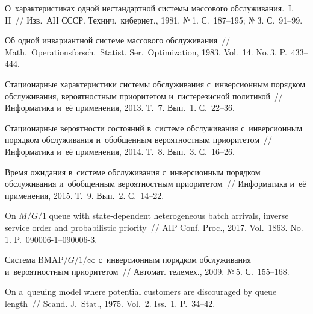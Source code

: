 \begin{multicols}{2}
\vspace*{-18pt}

{\small\frenchspacing
 {%
 \begin{thebibliography}{99}
 
 \vspace*{-3pt}
 
О~характеристиках одной нестандартной системы
массового обслуживания.~I, II~//
Изв.\ АН СССР. Технич.\ кибернет., 1981.
№\,1. С.~187--195; №\,3. С.~91--99.

 Об одной
инвариантной системе массового обслуживания~//
Math.\ Operationsforsch.\ Statist.
Ser.\ Optimization, 1983. Vol.~14. No.\,3. P.~433--444.

Стационарные характеристики системы обслуживания 
с~инверсионным порядком обслуживания, вероятностным
приоритетом и~гистерезисной политикой~//
Информатика и~её применения, 2013. Т.~7. Вып.~1. С.~22--36.




Стационарные вероятности состояний в~системе обслуживания с~инверсионным 
порядком обслуживания и~обобщенным вероятностным приоритетом~// Информатика 
и~её применения, 2014. Т.~8. Вып.~3. С.~16--26.

Время ожидания в~системе обслуживания с~инверсионным 
порядком обслуживания и~обобщенным
вероятностным приоритетом~// Информатика и~её применения, 2015. Т.~9. Вып.~2. С.~14--22.

 On ${M/G/1}$ queue with state-dependent heterogeneous 
batch arrivals, inverse service order and probabilistic priority~// 
AIP Conf. Proc., 2017. Vol.~1863. No.\,1. P.~090006-1--090006-3.

 Система $\mathrm{BMAP}/G/1/\infty$ с~инверсионным 
порядком обслуживания и~вероятностным приоритетом~// Автомат. телемех., 2009. 
№\,5. С.~155--168.


 On a~queuing model where potential customers are discouraged by queue length~//
Scand. J.~Stat., 1975. Vol.~2. Iss.~1. P.~34--42.





\end{thebibliography}}}
\end{multicols}
